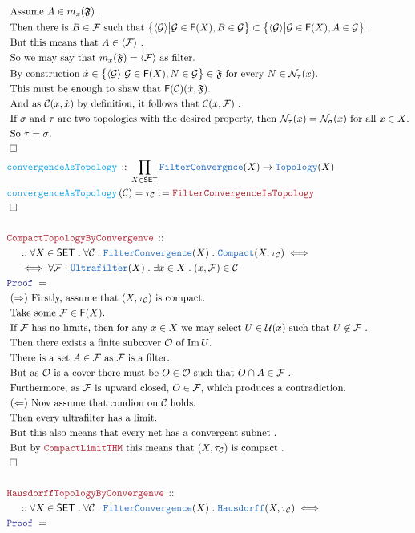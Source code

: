 \documentclass[12pt]{scrartcl}
\newcommand{\TYPE}[1]{\textcolor{NavyBlue}{\mathtt{#1}}}
\newcommand{\FUNC}[1]{\textcolor{Cerulean}{\mathtt{#1}}}
\newcommand{\LOGIC}[1]{\textcolor{Blue}{\mathtt{#1}}}
\newcommand{\THM}[1]{\textcolor{Maroon}{\mathtt{#1}}}
\renewcommand{\.}{\; . \;}
\newcommand{\de}{: \kern 0.1pc =}
\newcommand{\Act}[1]{\left( #1 \right)}
\newcommand{\Theorem}[2]{& \THM{#1} \, :: \, #2 \\ & \Proof = \\ }
\newcommand{\DeclareFunc}[2]{& \FUNC{#1} \, :: \, #2 \\}
\newcommand{\DefineNamedFunc}[4]{&  \FUNC{#1}\Act{#2} = #3 \de #4 \\}
\newcommand{\NewLine}{\\ & \kern 1pc}
\newcommand{\Page}[1]{ \begin{align*} #1 \end{align*}   }
\newcommand{\Explain}[1]{& \text{#1.} \\}
\newcommand{\Imply}{\Rightarrow}
\DeclareMathOperator*{\im}{Im}
\newcommand{\QED}{\; \square}
\newcommand{\EndProof}{& \QED \\}
\newcommand{\Proof}{\LOGIC{Proof} \; }
\renewcommand{\C}{\mathcal{C}}
\newcommand{\SET}{\mathsf{SET}}
\newcommand{\Topology}{\TYPE{Topology}}
\newcommand{\Compact}{\TYPE{Compact}}
\newcommand{\FILT}{\mathsf{F}}
\newcommand{\N}{\mathcal{N}}
\renewcommand{\U}{\mathcal{U}}
\renewcommand{\O}{\mathcal{O}}
\newcommand{\F}{\mathcal{F}}
\begin{document}
\newpage
\Page{
	\Explain{
	 	Assume $A \in  m_x(\mathfrak{F})$ 
	 }
	 \Explain{
	 	Then there is $B \in \F$ such that 
	 	$
	 		\big\{ \langle \mathcal{G} \rangle \big|\mathcal{G} \in \FILT(X), B \in \mathcal{G} \big\}
	 		\subset  
	 		\big\{ \langle \mathcal{G} \rangle \big|\mathcal{G} \in \FILT(X), A \in \mathcal{G} \big\}
	 	$
	 }
	 \Explain{ But this means that $A \in \langle \F \rangle$ }
	 \Explain{ So we may say that $m_x(\mathfrak{F}) = \langle\F\rangle$ as filter}
	 \Explain{
		By construction 
		$
		\dot x \in \big\{ \langle \mathcal{G} \rangle \big|\mathcal{G} \in \FILT(X), N \in \mathcal{G} \big\} 
		\in 	
		\mathfrak{F}$
		for every $N \in \N_\tau(x)$}
	\Explain{
		This must be enough to shaw that $\FILT(\C)(\dot x, \mathfrak{F})$}
	\Explain{
		And as $\C(x,\dot x)$ by definition, it follows that $\C(x,\F)$
	}
	\Explain{
		If  $\sigma$ and $\tau$ are two topologies with the desired property, 
		then $\N_\tau(x) = \N_\sigma(x)$ for all $x \in X$}
	\Explain{
		So $\tau = \sigma$}
	\EndProof
	\DeclareFunc{convergenceAsTopology}
	{
		\prod_{X \in \SET} \TYPE{FilterConvergnce}(X) \to \Topology(X)
	}
	\DefineNamedFunc{convergenceAsTopology}{\C}{\tau_\C}
	{
		\THM{FilterConvergenceIsTopology}
	} 
	\EndProof
	\\
	\Theorem{CompactTopologyByConvergenve}
	{
		\NewLine ::		
		\forall X \in \SET \.
		\forall \C : \TYPE{FilterConvergence}(X) \.
		\Compact(X,\tau_\C) 
		\iff
		\NewLine
		\iff
		\forall \F : \TYPE{Ultrafilter}(X) \.
		\exists x \in X \.
		(x,  \F) \in \C	
	}
	\Explain{ 
		$(\Imply)$
		Firstly, assume that $(X,\tau_\C)$ is compact}
	\Explain{
		Take some $\F \in \FILT(X)$}
	\Explain{
		If $\F$ has no limits, then for any $x \in X$ we may select
		$U \in \U(x)$ such that $U \not \in \F$		
	}
	\Explain{
		Then there exists a finite subcover $\O$
		of $\im U$}
	\Explain{
		There is a set $A \in \F$ as $\F$ 
		is a filter}
	\Explain{
		But as $\O$ is a cover
		there must be $O \in \O$ such that
		$O \cap A \in \F$
	}
	\Explain{
		Furthermore, as $\F$ is upward closed,
		$O \in \F$, which produces a contradiction}
	\Explain{
		$(\Leftarrow)$ Now assume that condion on $\C$ holds}
	\Explain{
		Then every ultrafilter has a limit}
	\Explain{
		But this also means that every net has a convergent subnet
	}
	\Explain{
		But by $\THM{CompactLimitTHM}$ this means that
		$(X,\tau_\C)$ is compact
	}
	\EndProof
	\\
	\Theorem{HausdorffTopologyByConvergenve}
	{
		\NewLine ::		
		\forall X \in \SET \.
		\forall \C : \TYPE{FilterConvergence}(X) \.
		\TYPE{Hausdorff}(X,\tau_\C) 
		\iff
}}
\end{document}
